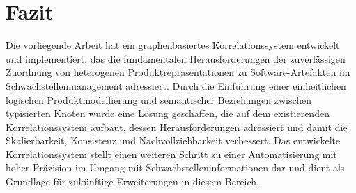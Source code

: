 \section{Fazit}

Die vorliegende Arbeit hat ein graphenbasiertes Korrelationssystem entwickelt und implementiert, das die fundamentalen Herausforderungen der zuverlässigen Zuordnung von heterogenen Produktrepräsentationen zu Software-Artefakten im Schwachstellenmanagement adressiert.
Durch die Einführung einer einheitlichen logischen Produktmodellierung und semantischer Beziehungen zwischen typisierten Knoten wurde eine Lösung geschaffen, die auf dem existierenden Korrelationssystem aufbaut, dessen Herausforderungen adressiert und damit die Skalierbarkeit, Konsistenz und Nachvollziehbarkeit verbessert.
Das entwickelte Korrelationssystem stellt einen weiteren Schritt zu einer Automatisierung mit hoher Präzision im Umgang mit Schwachstelleninformationen dar und dient als Grundlage für zukünftige Erweiterungen in diesem Bereich.
